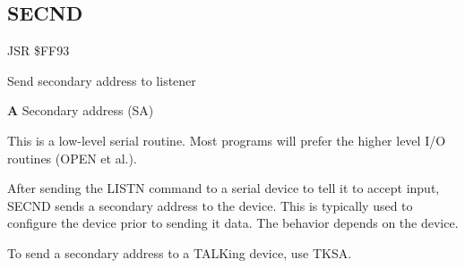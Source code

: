 \subsection{SECND}
\label{KERNAL Jump Table!SECND}
\begin{description}[leftmargin=2cm,style=nextline]
    \item [Address:] JSR \$FF93
    \item [Description:] Send secondary address to listener
    \item [Inputs:]
        \textbf{A} Secondary address (SA)
    \item [Remarks:]
        This is a low-level serial routine. Most programs will prefer the higher level I/O routines (OPEN et al.).

        After sending the LISTN command to a serial device to tell it to accept input, SECND sends a secondary address to the device. This is typically used to configure the device prior to sending it data. The behavior depends on the device.

        To send a secondary address to a TALKing device, use TKSA.
    \item [Example:]
\end{description}



\newpage
